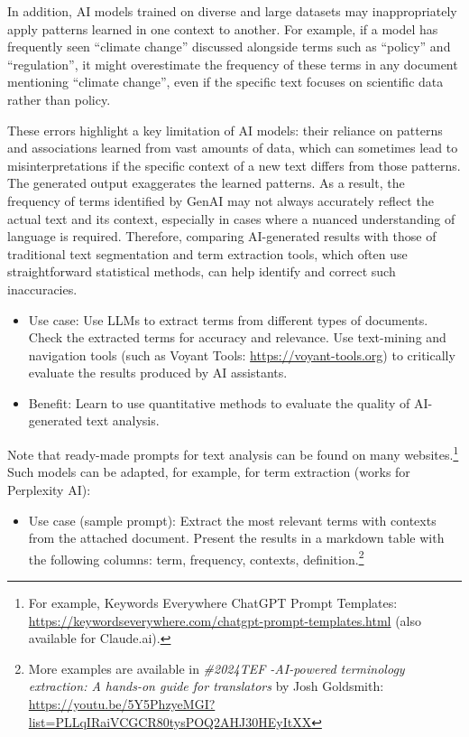 \documentclass[output=paper]{langscibook}
\begin{document}
In addition, AI models trained on diverse and large datasets may inappropriately apply patterns learned in one context to another. For example, if a model has frequently seen “climate change” discussed alongside terms such as “policy” and “regulation”, it might overestimate the frequency of these terms in any document mentioning “climate change”, even if the specific text focuses on scientific data rather than policy.

These errors highlight a key limitation of AI models: their reliance on patterns and associations learned from vast amounts of data, which can sometimes lead to misinterpretations if the specific context of a new text differs from those patterns. The generated output exaggerates the learned patterns. As a result, the frequency of terms identified by GenAI may not always accurately reflect the actual text and its context, especially in cases where a nuanced understanding of language is required. Therefore, comparing AI-generated results with those of traditional text segmentation and term extraction tools, which often use straightforward statistical methods, can help identify and correct such inaccuracies.

\begin{itemize}
\item Use case: Use LLMs to extract terms from different types of documents. Check the extracted terms for accuracy and relevance. Use text-mining and navigation tools (such as Voyant Tools: \url{https://voyant-tools.org}) to critically evaluate the results produced by AI assistants.
\item Benefit: Learn to use quantitative methods to evaluate the quality of AI-generated text analysis.
\end{itemize}
Note that ready-made prompts for text analysis can be found on many websites.\footnote{{For example, Keywords Everywhere ChatGPT Prompt Templates: \url{https://keywordseverywhere.com/chatgpt-prompt-templates.html} (also available for Claude.ai).}} Such models can be adapted, for example, for term extraction (works for Perplexity AI):

\begin{itemize}
\item Use case (sample prompt): Extract the most relevant terms with contexts from the attached document. Present the results in a markdown table with the following columns: term, frequency, contexts, definition.\footnote{ \textrm{More examples are available in} \textrm{\textit{\#2024TEF -AI-powered terminology extraction: A hands-on guide for translators} }\textrm{by}\textrm{ }\textrm{Josh Goldsmith: \url{https://youtu.be/5Y5PhzyeMGI?list=PLLqIRaiVCGCR80tysPOQ2AHJ30HEyItXX}}
}
\end{itemize}
\end{document}
